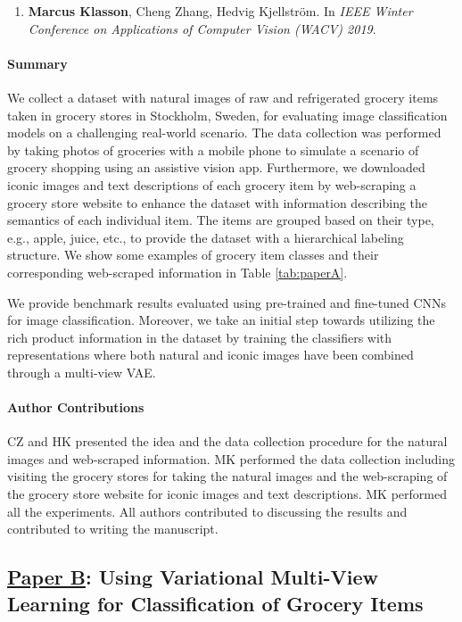 \begin{enumerate}
	\item[] \textbf{Marcus Klasson}, Cheng Zhang, Hedvig Kjellström. In \textit{IEEE Winter Conference on Applications of Computer Vision (WACV) 2019}.
\end{enumerate}

\paragraph{Summary}
We collect a dataset with natural images of raw and refrigerated grocery items taken in grocery stores in Stockholm, Sweden, for evaluating image classification models on a challenging real-world scenario. The data collection was performed by taking photos of groceries with a mobile phone to simulate a scenario of grocery shopping using an assistive vision app. Furthermore, we downloaded iconic images and text descriptions of each grocery item by web-scraping a grocery store website to enhance the dataset with information describing the semantics of each individual item. The items are grouped based on their type, e.g., apple, juice, etc., to provide the dataset with a hierarchical labeling structure. We show some examples of grocery item classes and their corresponding web-scraped information in Table \ref{tab:paperA}. 

We provide benchmark results evaluated using pre-trained and fine-tuned CNNs for image classification. Moreover, we take an initial step towards utilizing the rich product information in the dataset by training the classifiers with representations where both natural and iconic images have been combined through a multi-view VAE. 


\paragraph{Author Contributions}
CZ and HK presented the idea and the data collection procedure for the natural images and web-scraped information. MK performed the data collection including visiting the grocery stores for taking the natural images and the web-scraping of the grocery store website for iconic images and text descriptions. MK performed all the experiments. All authors contributed to discussing the results and contributed to writing the manuscript. 


\subsection{\underline{Paper B}: Using Variational Multi-View Learning for Classification of Grocery Items}
\label{sec:paperB}

